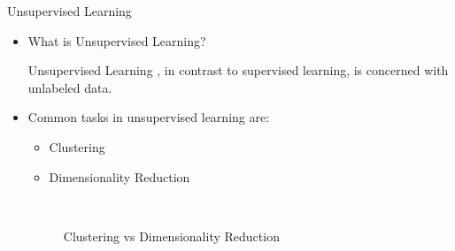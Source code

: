 \documentclass[compress,oilve]{beamer}
\newcommand{\tc}[2]{
	\textcolor{#1}{#2}
}
\begin{document}
\begin{frame}{Unsupervised Learning}
	\begin{itemize}
	\item \tc{keywords}{What is Unsupervised Learning?}\\
	\medskip
	
	\tc{keywords}{Unsupervised Learning}, in contrast to supervised learning, is concerned with unlabeled data. 
	
	\medskip
	\item Common tasks in unsupervised learning are:
	
	\begin{itemize}
		\item \tc{keywords}{Clustering}  
		\item \tc{keywords}{Dimensionality Reduction}
	\end{itemize}
	
	\begin{figure}[htbp!]
		\qquad
		\\
		
		\tiny
		\caption{Clustering vs Dimensionality Reduction}
		\label{fig:globalfigure2}
		
	\end{figure}
	
	\end{itemize}
\end{frame}
\end{document}
